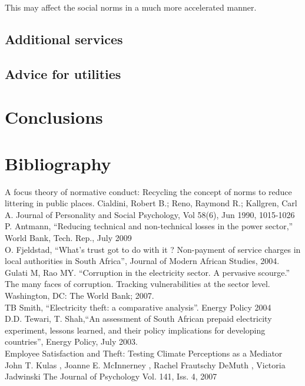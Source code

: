 \documentclass{article}
\begin{document}
This may affect the social norms in a much more accelerated manner.\\ 

\subsection{Additional services}

\subsection{Advice for utilities}

\section{Conclusions}
\section{Bibliography}

A focus theory of normative conduct: Recycling the concept of norms to reduce littering in public places.
Cialdini, Robert B.; Reno, Raymond R.; Kallgren, Carl A.
Journal of Personality and Social Psychology, Vol 58(6), Jun 1990, 1015-1026\\

P. Antmann, “Reducing technical and non-technical losses in the power sector,” World Bank, Tech. Rep., July 2009\\

O. Fjeldstad, “What’s trust got to do with it ? Non-payment of service charges in local authorities in South Africa”, Journal of Modern African Studies, 2004.\\

Gulati M, Rao MY. “Corruption in the electricity sector. A pervasive scourge.” The many faces of corruption. Tracking vulnerabilities at the sector level. Washington, DC: The World Bank; 2007.\\

TB Smith, “Electricity theft: a comparative analysis”. Energy Policy 2004\\

D.D. Tewari, T. Shah,“An assessment of South African prepaid electricity experiment, lessons learned, and their policy implications for developing countries”, Energy Policy, July 2003.\\

Employee Satisfaction and Theft: Testing Climate Perceptions as a Mediator
John T. Kulas , Joanne E. McInnerney , Rachel Frautschy DeMuth , Victoria Jadwinski 
The Journal of Psychology 
Vol. 141, Iss. 4, 2007
\end{document}
